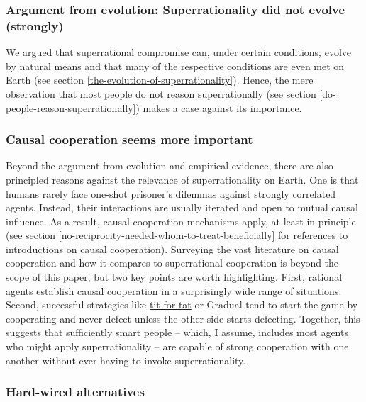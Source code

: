 \subsubsection{Argument from evolution: Superrationality did not evolve
(strongly)}\label{argument-from-evolution-superrationality-did-not-evolve-strongly}

We argued that superrational compromise can, under certain conditions,
evolve by natural means and that many of the respective conditions are
even met on Earth (see section
\ref{the-evolution-of-superrationality}). Hence, the mere observation that
most people do not reason superrationally (see section
\ref{do-people-reason-superrationally}) makes a case against its importance.

\subsubsection{Causal cooperation seems more
important}\label{causal-cooperation-seems-more-important}

Beyond the argument from evolution and empirical evidence, there are
also principled reasons against the relevance of superrationality on
Earth. One is that humans rarely face one-shot prisoner's dilemmas
against strongly correlated agents. Instead, their interactions are
usually iterated and open to mutual causal influence. As a result,
causal cooperation mechanisms apply, at least in principle (see section
\ref{no-reciprocity-needed-whom-to-treat-beneficially} for references to introductions on causal cooperation).
Surveying the vast literature on causal cooperation and how it compares
to superrational cooperation is beyond the scope of this paper, but two
key points are worth highlighting. First, rational agents establish
causal cooperation in a surprisingly wide range of situations. Second,
successful strategies like
\href{https://en.wikipedia.org/wiki/Tit_for_tat}{tit-for-tat} or
Gradual \parencite{Beaufils1997-mi} tend to start the game
by cooperating and never defect unless the other side starts defecting.
Together, this suggests that sufficiently smart people -- which, I
assume, includes most agents who might apply superrationality -- are
capable of strong cooperation with one another without ever having to
invoke superrationality.

\subsubsection{Hard-wired alternatives}\label{hard-wired-alternatives}

